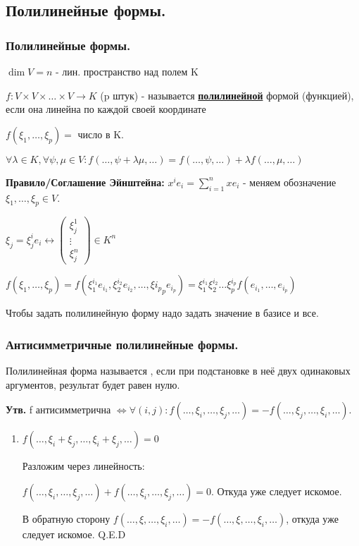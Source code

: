 \subsection{Полилинейные формы.}
\subsubsection{Полилинейные формы.}
\(\dim V = n\) - лин. пространство над полем K

\(f: V \times V \times \ldots \times V \rightarrow K\) (p штук) - называется \uline{\textbf{полилинейной}} формой (функцией), если она линейна по каждой своей координате

\(f(\xi_1,\ldots,\xi_p) = \) число в K.

\(\forall \lambda \in K, \forall \psi, \mu \in V: f(\ldots,\psi + \lambda \mu,\ldots) = f(\ldots, \psi, \ldots) + \lambda f(\ldots,\mu,\ldots)\)

\textbf{Правило/Соглашение Эйнштейна:} \(x^i e_i = \sum\limits_{i=1}^n x e_i\) - меняем обозначение
$\xi_1,\ldots, \xi_p \in V$.

\(\xi_j  = \xi_j^ie_i \leftrightarrow \begin{pmatrix}
    \xi_j^1 \\
    \vdots  \\
    \xi_j^n
\end{pmatrix} \in K^n \)

\(f(\xi_1,\ldots,\xi_p) = f(\xi_1^{i_1}e_{i_1}, \xi_2^{i_2}e_{i_2},\ldots, \xi{i_p}_p e_{i_p}) =  \xi_1^{i_1} \xi_2^{i_2}\ldots \xi_p^{i_p} f(e_{i_1},
\ldots,e_{i_p})\) %

Чтобы задать полилинейную форму надо задать значение в базисе и все.
\subsubsection{Антисимметричные полилинейные формы.}

Полилинейная форма называется , если при подстановке в неё двух одинаковых аргументов, результат будет равен нулю.

\textbf{Утв.} f антисимметрична \(\Leftrightarrow \forall(i,j): f(\ldots,\xi_i,\ldots, \xi_j,\ldots) =- f(\ldots,\xi_j,\ldots, \xi_i,\ldots) \).

\begin{enumerate}
    \item[] \prooff{}
    \(f(\ldots, \xi_i + \xi_j,\ldots, \xi_i + \xi_j,\ldots) = 0\)

Разложим через линейность:

\(f(\ldots, \xi_i,\ldots,  \xi_j,\ldots)  + f(\ldots, \xi_i,\ldots,  \xi_j,\ldots)  = 0\). Откуда уже следует искомое.

В обратную сторону  \(f(\ldots, \xi ,\ldots, \xi_i,\ldots) = - f(\ldots, \xi ,\ldots, \xi_i,\ldots)\), откуда уже следует искомое.  Q.E.D
\end{enumerate}
